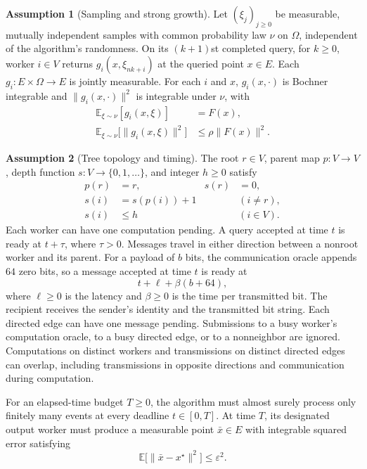 \documentclass[10pt]{article}
\theoremstyle{definition}
\newtheorem{assumption}{Assumption}
\begin{document}
\begin{assumption}[Sampling and strong growth]
Let $(\xi_j)_{j\geq0}$ be measurable, mutually independent samples with common probability law $\nu$ on $\Omega$, independent of the algorithm's randomness. On its $(k+1)$st completed query, for $k\geq0$, worker $i\in V$ returns $g_i(x,\xi_{nk+i})$ at the queried point $x\in E$. Each $g_i:E\times\Omega\to E$ is jointly measurable. For each $i$ and $x$, $g_i(x,\cdot)$ is Bochner integrable and $\|g_i(x,\cdot)\|^2$ is integrable under $\nu$, with
\[
\begin{aligned}
\mathbb{E}_{\xi\sim\nu}[g_i(x,\xi)] &= F(x),\\
\mathbb{E}_{\xi\sim\nu}\bigl[\|g_i(x,\xi)\|^2\bigr] &\leq \rho\|F(x)\|^2.
\end{aligned}
\]
\end{assumption}

\begin{assumption}[Tree topology and timing]
The root $r\in V$, parent map $p:V\to V$, depth function $s:V\to\{0,1,\ldots\}$, and integer $h\geq0$ satisfy
\[
\begin{aligned}
p(r)&=r, & s(r)&=0,\\
s(i)&=s(p(i))+1 &&(i\ne r),\\
s(i)&\leq h &&(i\in V).
\end{aligned}
\]
Each worker can have one computation pending. A query accepted at time $t$ is ready at $t+\tau$, where $\tau>0$. Messages travel in either direction between a nonroot worker and its parent. For a payload of $b$ bits, the communication oracle appends $64$ zero bits, so a message accepted at time $t$ is ready at
\[
t+\ell+\beta(b+64),
\]
where $\ell\geq0$ is the latency and $\beta\geq0$ is the time per transmitted bit. The recipient receives the sender's identity and the transmitted bit string. Each directed edge can have one message pending. Submissions to a busy worker's computation oracle, to a busy directed edge, or to a nonneighbor are ignored. Computations on distinct workers and transmissions on distinct directed edges can overlap, including transmissions in opposite directions and communication during computation.
\end{assumption}

For an elapsed-time budget $T\geq0$, the algorithm must almost surely process only finitely many events at every deadline $t\in[0,T]$. At time $T$, its designated output worker must produce a measurable point $\bar{x}\in E$ with integrable squared error satisfying
\[
\mathbb{E}\bigl[\|\bar{x}-x^\star\|^2\bigr]\leq\varepsilon^2.
\]
\end{document}
